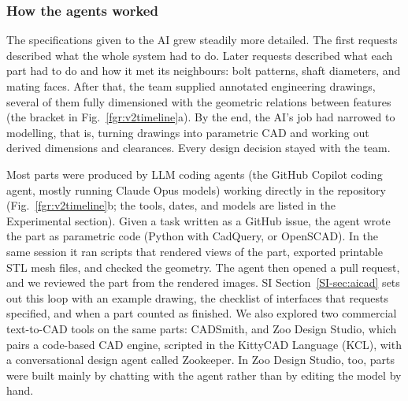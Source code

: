 \documentclass[twoside,twocolumn,9pt]{article}
\newcommand{\siref}[1]{\ref*{SI-#1}}
\begin{document}
\subsubsection{How the agents worked}
The specifications given to the AI grew steadily more detailed. The first requests described what the whole system had to do. Later requests described what each part had to do and how it met its neighbours: bolt patterns, shaft diameters, and mating faces. After that, the team supplied annotated engineering drawings, several of them fully dimensioned with the geometric relations between features (the bracket in Fig.~\ref{fgr:v2timeline}a). By the end, the AI's job had narrowed to modelling, that is, turning drawings into parametric CAD and working out derived dimensions and clearances. Every design decision stayed with the team.

Most parts were produced by LLM coding agents (the GitHub Copilot coding agent, mostly running Claude Opus models) working directly in the repository (Fig.~\ref{fgr:v2timeline}b; the tools, dates, and models are listed in the Experimental section). Given a task written as a GitHub issue, the agent wrote the part as parametric code (Python with CadQuery, or OpenSCAD). In the same session it ran scripts that rendered views of the part, exported printable STL mesh files, and checked the geometry. The agent then opened a pull request, and we reviewed the part from the rendered images. SI Section~\siref{sec:aicad} sets out this loop with an example drawing, the checklist of interfaces that requests specified, and when a part counted as finished. We also explored two commercial text-to-CAD tools on the same parts: CADSmith, and Zoo Design Studio, which pairs a code-based CAD engine, scripted in the KittyCAD Language (KCL), with a conversational design agent called Zookeeper. In Zoo Design Studio, too, parts were built mainly by chatting with the agent rather than by editing the model by hand.
\end{document}

